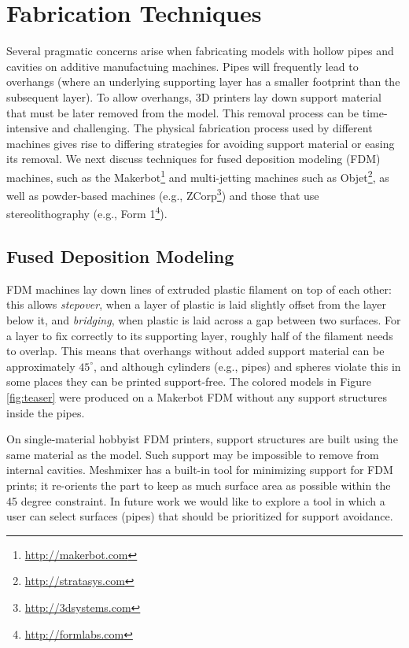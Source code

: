 \section{Fabrication Techniques}
Several pragmatic concerns arise when fabricating models with hollow pipes and cavities on additive manufactuing machines. Pipes will frequently lead to overhangs (where an underlying supporting layer has a smaller footprint than the subsequent layer).
To allow overhangs, 3D printers lay down support material that must be later removed from the model.  This removal process can be time-intensive and challenging.  The physical fabrication process used by different machines gives rise to differing strategies for avoiding support material or easing its removal.  We next discuss techniques for fused deposition modeling (FDM) machines, such as the Makerbot\footnote{\url{http://makerbot.com}} and multi-jetting machines such as Objet\footnote{\url{http://stratasys.com}}, as well as powder-based machines (e.g., ZCorp\footnote{\url{http://3dsystems.com}}) and those that use stereolithography (e.g., Form 1\footnote{\url{http://formlabs.com}}).

\subsection{Fused Deposition Modeling}
FDM machines lay down lines of extruded plastic filament on top of each other: this allows {\em stepover}, when a layer of plastic is laid slightly offset from the layer below it, and {\em bridging}, when plastic is laid across a gap between two surfaces.  For a layer to fix correctly to its supporting layer, roughly half of the filament needs to overlap.  This means that overhangs without added support material can be approximately $45^{\circ}$, and although cylinders (e.g., pipes) and spheres violate this in some places they can be printed support-free. The colored models in Figure \ref{fig:teaser} were produced on a Makerbot FDM without any support structures inside the pipes.

On single-material hobbyist FDM printers, support structures are built using the same material as the model. Such support may be impossible to remove from internal cavities.  Meshmixer has a built-in tool for minimizing support for FDM prints; it re-orients the part to keep as much surface area as possible within the 45 degree constraint.  In future work we would like to explore a tool in which a user can select surfaces (pipes) that should be prioritized for support avoidance.


